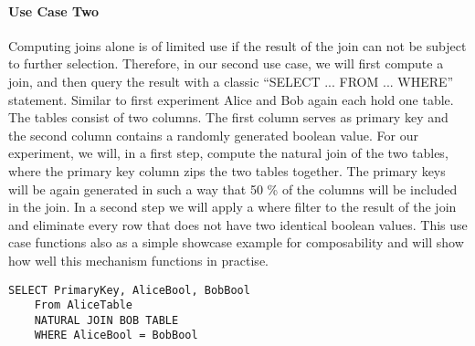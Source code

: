 \paragraph{Use Case Two}
Computing joins alone is of limited use if the result of the join can not be subject to further selection. Therefore, in our second use case, we will first compute a join, and then query the result with a classic ``SELECT ... FROM ... WHERE'' statement. Similar to first experiment Alice and Bob again each hold one table. The tables consist of two columns. The first column serves as primary key and the second column contains a randomly generated boolean value. For our experiment, we will, in a first step, compute the natural join of the two tables, where the primary key column zips the two tables together. The primary keys will be again generated in such a way that 50 \% of the columns will be included in the join. In a second step we will apply a where filter to the result of the join and eliminate every row that does not have two identical boolean values. This use case functions also as a simple showcase example for composability and will show how well this mechanism functions in practise.    
\label{SQL2_label}		
\begin{lstlisting}[caption={Functional equivalent SQL statement for our second use case}]
	SELECT PrimaryKey, AliceBool, BobBool
	From AliceTable 
	NATURAL JOIN BOB TABLE
	WHERE AliceBool = BobBool
\end{lstlisting}

 

